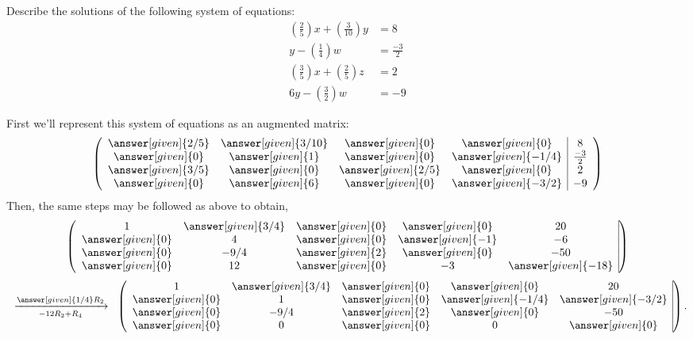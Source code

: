\documentclass{ximera}
\begin{document}
\begin{example}
  Describe the solutions of the following system of equations:
\begin{align*}
\left(\frac{2}{5}\right)x + \left(\frac{3}{10}\right) y &= 8\\
y -\left(\frac{1}{4}\right)w &= \frac{-3}{2}\\
\left(\frac{3}{5}\right)x + \left(\frac{2}{5}\right)z &= 2\\
6y - \left(\frac{3}{2}\right)w &= -9
\end{align*}
\begin{explanation}
First we'll represent this system of equations as an augmented matrix:
\[
  \left(\begin{array}{cccc|c}
   \answer[given]{2/5}&  \answer[given]{3/10} & \answer[given]{0} &\answer[given]{0} &8 \\
  \answer[given]{0}&  \answer[given]{1} & \answer[given]{0} &\answer[given]{-1/4} &\frac{-3}{2}\\
  \answer[given]{3/5}&  \answer[given]{0} & \answer[given]{2/5} &\answer[given]{0} &2\\
  \answer[given]{0}&  \answer[given]{6} & \answer[given]{0} &\answer[given]{-3/2} &-9
\end{array}\right)
\]
Then, the same steps may be followed as above to obtain,
\[
\left(\begin{array}{ccccc|c}
   1&  \answer[given]{3/4} & \answer[given]{0} &\answer[given]{0} &20 \\
  \answer[given]{0}&  4 & \answer[given]{0} &\answer[given]{-1} &-6\\
  \answer[given]{0}&  -9/4 & \answer[given]{2} &\answer[given]{0} &-50\\
  \answer[given]{0}&  12 & \answer[given]{0} &-3 &\answer[given]{-18}
\end{array}\right)
\]
\[
\hspace{.2cm}\xrightarrow[-12 R_{2} + R_{4}]{\answer[given]{1/4}R_{2}}\hspace{.2cm}
\left(\begin{array}{ccccc|c}
   1&  \answer[given]{3/4} & \answer[given]{0} &\answer[given]{0} &20 \\
  \answer[given]{0}&  1 & \answer[given]{0} &\answer[given]{-1/4} &\answer[given]{-3/2}\\
  \answer[given]{0}&  -9/4 & \answer[given]{2} &\answer[given]{0} &-50\\
  \answer[given]{0}&  0 & \answer[given]{0} &0 &\answer[given]{0}
\end{array}\right).
\]
\end{explanation}
\end{example}
\end{document}
